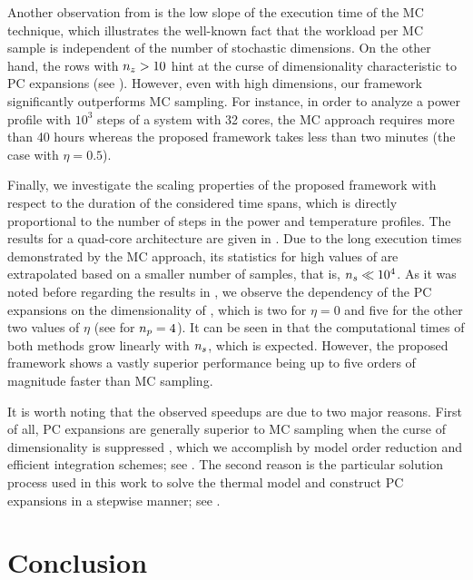 Another observation from  is the low slope of
the execution time of the MC technique, which illustrates the well-known fact
that the workload per MC sample is independent of the number of stochastic
dimensions. On the other hand, the rows with ${n_{z}} > 10$ hint at the curse of
dimensionality characteristic to PC expansions (see
). However, even with high dimensions, our
framework significantly outperforms MC sampling. For instance, in order to
analyze a power profile with $10^3$ steps of a system with 32 cores, the MC
approach requires more than 40 hours whereas the proposed framework takes less
than two minutes (the case with $\eta = 0.5$).

Finally, we investigate the scaling properties of the proposed framework with
respect to the duration of the considered time spans, which is directly
proportional to the number of steps \ns in the power and temperature profiles.
The results for a quad-core architecture are given in .
Due to the long execution times demonstrated by the MC approach, its statistics
for high values of \ns are extrapolated based on a smaller number of samples,
that is, ${n_{s}} \ll 10^4$. As it was noted before regarding the results in
, we observe the dependency of the PC expansions
on the dimensionality \nz of \vz, which is two for $\eta = 0$ and five for the
other two values of $\eta$ (see  for ${n_{p}} = 4$).
It can be seen in  that the computational times of both
methods grow linearly with ${n_{s}}$, which is expected. However, the proposed
framework shows a vastly superior performance being up to five orders of
magnitude faster than MC sampling.

It is worth noting that the observed speedups are due to two major reasons.
First of all, PC expansions are generally superior to MC sampling when the curse
of dimensionality is suppressed \cite{xiu2010, eldred2008}, which we accomplish
by model order reduction and efficient integration schemes; see
. The second reason is the particular solution
process used in this work to solve the thermal model and construct PC expansions
in a stepwise manner; see .

\section{Conclusion}

